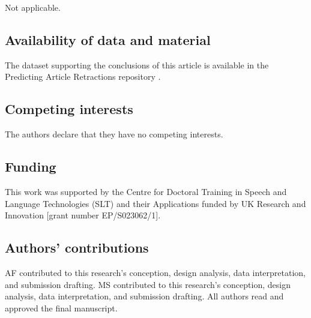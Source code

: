 \documentclass[pdflatex,sn-mathphys-num]{sn-jnl}
\begin{document}
Not applicable.

\subsection*{Availability of data and material}
\label{sec:Data Availability}
The dataset supporting the conclusions of this article is available in the Predicting Article Retractions repository \cite{noauthor_anonymized_nodate}.

\subsection*{Competing interests}
The authors declare that they have no competing interests.


\subsection*{Funding}
\label{sec:Funding}
This work was supported by the Centre for Doctoral Training in Speech and Language Technologies (SLT) and their Applications funded by UK Research and Innovation [grant number EP/S023062/1].


\subsection*{Authors' contributions }

AF contributed to this research's conception, design analysis, data interpretation, and submission drafting. MS contributed to this research's conception, design analysis, data interpretation, and submission drafting. All authors read and approved the final manuscript.
\end{document}
